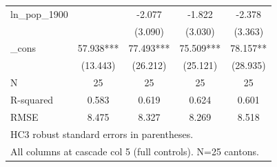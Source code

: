 \begin{table}[htbp]
\begin{tabular}{l*{4}{c}}
ln\_pop\_1900 &               &      -2.077   &      -1.822   &      -2.378   \\
            &               &     (3.090)   &     (3.030)   &     (3.363)   \\
\_cons      &      57.938***&      77.493***&      75.509***&      78.157** \\
            &    (13.443)   &    (26.212)   &    (25.121)   &    (28.935)   \\
\midrule
N           &          25   &          25   &          25   &          25   \\
R-squared   &       0.583   &       0.619   &       0.624   &       0.601   \\
RMSE        &       8.475   &       8.327   &       8.269   &       8.518   \\
\bottomrule
\multicolumn{5}{l}{\footnotesize HC3 robust standard errors in parentheses.}\\
\multicolumn{5}{l}{\footnotesize All columns at cascade col 5 (full controls). N=25 cantons.}\\
\end{tabular}
\end{table}

